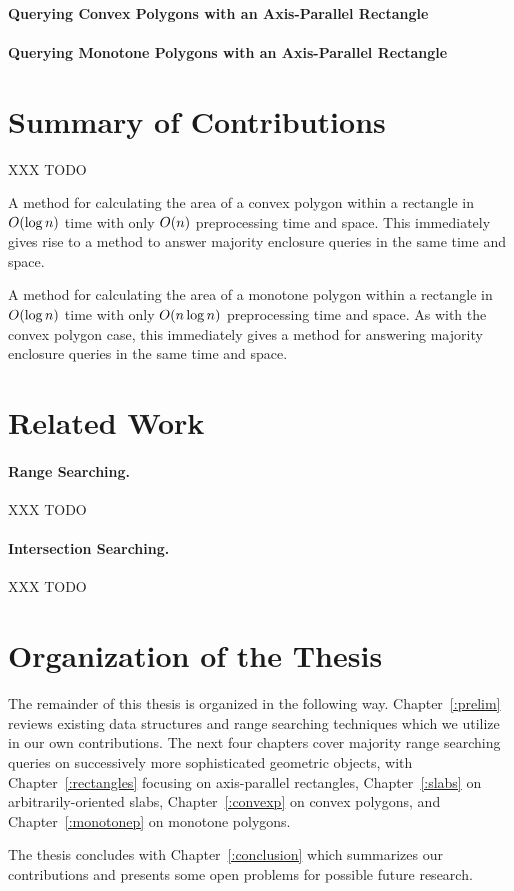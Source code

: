 \paragraph{Querying Convex Polygons with an Axis-Parallel Rectangle}

\paragraph{Querying Monotone Polygons with an Axis-Parallel Rectangle}



\section{Summary of Contributions}
\label{:introduction:contributions}

XXX TODO

A method for calculating the area of a convex polygon within a rectangle in $O\!\left(\log{n}\right)$ time with only
$O\!\left(n\right)$ preprocessing time and space. This immediately gives rise to a method to answer majority enclosure queries in the same time and space.

A method for calculating the area of a monotone polygon within a rectangle in $O\!\left(\log{n}\right)$ time with only
$O\!\left(n \log{n}\right)$ preprocessing time and space. As with the convex polygon case, this immediately gives a method for answering majority enclosure queries in the same time and space.



\section{Related Work}
\label{:intro:related}

\paragraph{Range Searching.} 
XXX TODO

\paragraph{Intersection Searching.} 
XXX TODO


\section{Organization of the Thesis}
\label{:introduction:organization}

The remainder of this thesis is organized in the following way. 
Chapter~\ref{:prelim} reviews existing data structures and range searching techniques which we utilize in our own contributions.
The next four chapters cover majority range searching queries on successively more sophisticated geometric objects, with Chapter~\ref{:rectangles} focusing on axis-parallel rectangles, Chapter~\ref{:slabs} on arbitrarily-oriented slabs, Chapter~\ref{:convexp} on convex polygons, and Chapter~\ref{:monotonep} on monotone polygons.

The thesis concludes with Chapter~\ref{:conclusion} which summarizes our contributions and presents some open problems for possible future research.



